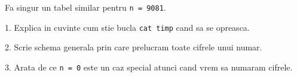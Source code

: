 \begin{solobox}
  Fa singur un tabel similar pentru \texttt{n = 9081}.
\end{solobox}

\newpage
{}

\begin{solobox}
  1. Explica in cuvinte cum stie bucla \texttt{cat timp} cand sa se opreasca.

  2. Scrie schema generala prin care prelucram toate cifrele unui numar.

  3. Arata de ce \texttt{n = 0} este un caz special atunci cand vrem sa numaram cifrele.
\end{solobox}
